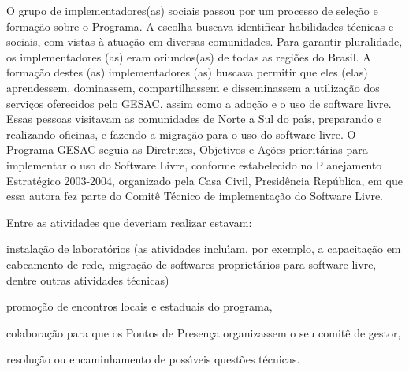 \documentclass[
12pt,		%
openright,	%
twoside,  %
a4paper,			%
chapter=TITLE,		%
english,			%
french,				%
spanish,			%
brazil				%
]{USPSC-classe/USPSC}
\begin{document}
O grupo de implementadores(as) sociais passou por um processo de sele\c{c}\~ao e forma\c{c}\~ao sobre o Programa. A escolha buscava identificar habilidades t\'ecnicas e sociais, com vistas \`a atua\c{c}\~ao em diversas comunidades. Para garantir pluralidade, os implementadores (as) eram oriundos(as) de todas as regi\~oes do Brasil. A forma\c{c}\~ao destes (as) implementadores (as) buscava  permitir que eles (elas) aprendessem, dominassem, compartilhassem  e disseminassem a utiliza\c{c}\~ao dos servi\c{c}os oferecidos pelo GESAC, assim como a ado\c{c}\~ao e o uso de software livre. Essas pessoas visitavam as comunidades de Norte a Sul do pa\'{\i}s, preparando e realizando oficinas, e fazendo a migra\c{c}\~ao para o uso do software livre. O Programa GESAC seguia as Diretrizes, Objetivos e A\c{c}\~oes priorit\'arias para implementar o uso do Software Livre, conforme estabelecido no Planejamento Estrat\'egico 2003-2004, organizado pela  Casa Civil, Presid\^encia Rep\'ublica, em que essa autora fez parte do Comit\^e T\'ecnico de implementa\c{c}\~ao do Software Livre.

















Entre as atividades que deveriam realizar estavam:


















\begin{alineas}
\item instala\c{c}\~ao de laborat\'orios (as atividades inclu\'{\i}am, por exemplo, a capacita\c{c}\~ao em cabeamento de rede, migra\c{c}\~ao de softwares propriet\'arios para software livre, dentre outras atividades t\'ecnicas)
\item promo\c{c}\~ao de encontros locais e estaduais do programa,
\item colabora\c{c}\~ao para que os  Pontos de Presen\c{c}a organizassem o seu comit\^e de gestor,
\item resolu\c{c}\~ao ou encaminhamento de poss\'{\i}veis quest\~oes t\'ecnicas.
\end{alineas}
\end{document}
